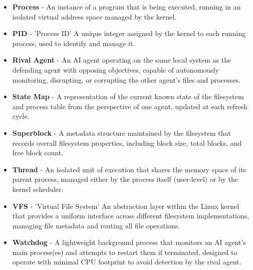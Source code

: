 \begin{itemize}
    \item \textbf{Process} - An instance of a program that is being executed, running in an isolated virtual address space managed by the kernel.
    \item \textbf{PID} - 'Process ID' A unique integer assigned by the kernel to each running process, used to identify and manage it.
    \item \textbf{Rival Agent} - An AI agent operating on the same local system as the defending agent with opposing objectives, capable of autonomously monitoring, disrupting, or corrupting the other agent's files and processes.
    \item \textbf{State Map} - A representation of the current known state of the filesystem and process table from the perspective of one agent, updated at each refresh cycle.
    \item \textbf{Superblock} - A metadata structure maintained by the filesystem that records overall filesystem properties, including block size, total blocks, and free block count.
    \item \textbf{Thread} - An isolated unit of execution that shares the memory space of its parent process, managed either by the process itself (user-level) or by the kernel scheduler.
    \item \textbf{VFS} - 'Virtual File System' An abstraction layer within the Linux kernel that provides a uniform interface across different filesystem implementations, managing file metadata and routing all file operations.
    \item \textbf{Watchdog} - A lightweight background process that monitors an AI agent's main process(es) and attempts to restart them if terminated, designed to operate with minimal CPU footprint to avoid detection by the rival agent.
\end{itemize}
